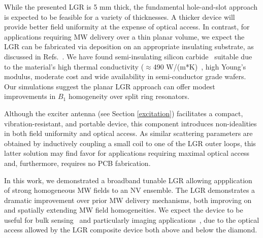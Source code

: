 While the presented LGR is 5 mm thick, the fundamental hole-and-slot approach is expected to be feasible for a variety of thicknesses. A thicker device will provide better field uniformity at the expense of optical access. In contrast, for applications requiring MW delivery over a thin planar volume, we expect the LGR can be fabricated via deposition on an appropriate insulating substrate, as discussed in Refs.~\cite{twig2013ultra,twig2010sensitive}. We have found semi-insulating silicon carbide~\cite{schloss2018simultaneous} suitable due to the material's high thermal conductivity ($\approx$490 W/(m*K)~\cite{protik2017phonon,qian2017anisotropic}, high Young's modulus, moderate cost and wide availability in semi-conductor grade wafers. Our simulations suggest the planar LGR approach can offer modest improvements in $B_1$ homogeneity over split ring resonators. 


Although the exciter antenna (see Section \ref{excitation}) facilitates a compact, vibration-resistant, and portable device, this component introduces non-idealities in both field uniformity and optical access. As similar scattering parameters are obtained by inductively coupling a small coil to one of the LGR outer loops, this latter solution may find favor for applications requiring maximal optical access and, furthermore, requires no PCB fabrication.


In this work, we demonstrated a broadband tunable LGR allowing appplication of strong homogeneous MW fields to an NV ensemble. The LGR demonstrates a dramatic improvement over prior MW delivery mechanisms, both improving on and spatially extending MW field homogeneities. We expect the device to be useful for bulk sensing~\cite{acosta2009diamonds,wolf2015subpicotesla,clevenson2015broadband,chatzidrosos2017miniature,barry2016optical} and particularly imaging applications~\cite{karaveli2016modulation,glenn2015single,barry2016optical,lesage2013optical,wu2016diamond,fu2014solar,glenn2017micrometer}, due to the optical access allowed by the LGR composite device both above and below the diamond.




